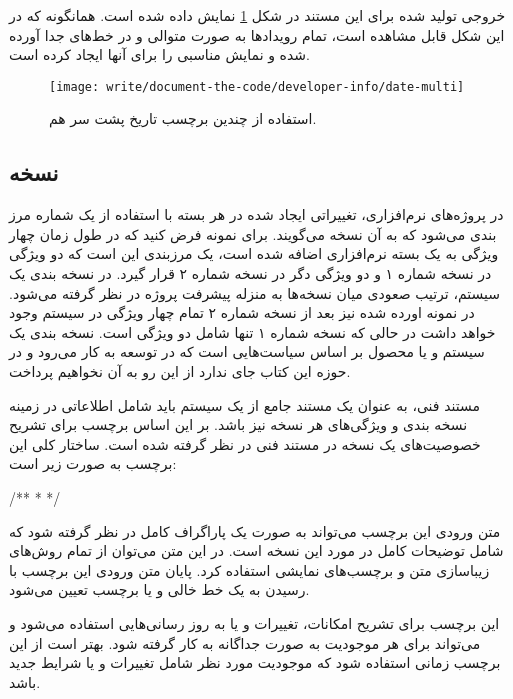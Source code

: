 خروجی تولید شده برای این مستند در شکل
\ref{write/document-the-code/developer-info/date-multi} نمایش داده شده است.
همانگونه که در این شکل قابل مشاهده است، تمام رویدادها به صورت متوالی و در خط‌های
جدا آورده شده و نمایش مناسبی را برای آنها ایجاد کرده است.
\begin{figure}
	\centering
	\texttt{[image: write/document-the-code/developer-info/date-multi]}
	\caption[چند برچسب تاریخ]{
		استفاده از چندین برچسب تاریخ پشت سر هم.
	}
	\label{write/document-the-code/developer-info/date-multi}
\end{figure}


\subsection{نسخه}

در پروژه‌های نرم‌افزاری، تغییراتی ایجاد شده در هر بسته با استفاده از یک شماره
مرز بندی می‌شود که به آن نسخه می‌گویند.
برای نمونه فرض کنید که در طول زمان چهار ویژگی به یک بسته نرم‌افزاری اضافه شده
است، یک مرزبندی این است که دو ویژگی در نسخه شماره ۱ و دو ویژگی دگر در نسخه شماره
۲ قرار گیرد.
در نسخه بندی یک سیستم، ترتیب صعودی میان نسخه‌ها به منزله پیشرفت پروژه در نظر
گرفته می‌شود.
در نمونه اورده شده نیز بعد از نسخه شماره ۲ تمام چهار ویژگی در سیستم وجود خواهد
داشت در حالی که نسخه شماره ۱ تنها شامل دو ویژگی است.
نسخه بندی یک سیستم و یا محصول بر اساس سیاست‌هایی است که در توسعه به کار می‌رود و
در حوزه این کتاب جای ندارد از این رو به آن نخواهیم پرداخت.

مستند فنی، به عنوان یک مستند جامع از یک سیستم باید شامل اطلاعاتی در زمینه نسخه
بندی و ویژگی‌های هر نسخه نیز باشد.
بر این اساس برچسب  برای تشریح خصوصیت‌های یک نسخه در مستند فنی در نظر
گرفته شده است.
ساختار کلی این برچسب به صورت زیر است:
\begin{C++}
/**
 * 
 */
\end{C++}

متن ورودی این برچسب می‌تواند به صورت یک پاراگراف کامل در نظر گرفته شود که شامل
توضیحات کامل در مورد این نسخه است.
در این متن می‌توان از تمام روش‌های زیباسازی متن و برچسب‌های نمایشی استفاده کرد.
پایان متن ورودی این برچسب با رسیدن به یک خط خالی و یا برچسب تعیین می‌شود.

\begin{note}
این برچسب برای تشریح امکانات، تغییرات و یا به روز رسانی‌هایی استفاده می‌شود و
می‌تواند برای هر موجودیت به صورت جداگانه به کار گرفته شود.
بهتر است از این برچسب زمانی استفاده شود که موجودیت مورد نظر شامل تغییرات و یا
شرایط جدید باشد.
\end{note}

